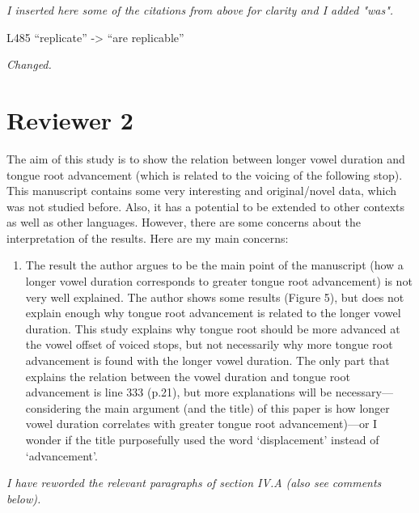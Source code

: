 \documentclass[]{article}
\providecommand{\tightlist}{%
  \setlength{\itemsep}{0pt}\setlength{\parskip}{0pt}}
\begin{document}
\begin{adjustwidth}{1cm}{} \textit{
I inserted here some of the citations from above for clarity and I added "was".
} \end{adjustwidth}

L485 ``replicate'' -\textgreater{} ``are replicable''

\begin{adjustwidth}{1cm}{} \textit{
Changed.
} \end{adjustwidth}

\hypertarget{reviewer-2}{%
\section{Reviewer 2}\label{reviewer-2}}

The aim of this study is to show the relation between longer vowel
duration and tongue root advancement (which is related to the voicing of
the following stop). This manuscript contains some very interesting and
original/novel data, which was not studied before. Also, it has a
potential to be extended to other contexts as well as other languages.
However, there are some concerns about the interpretation of the
results. Here are my main concerns:

\begin{enumerate}
\def\labelenumi{\arabic{enumi}.}
\tightlist
\item
  The result the author argues to be the main point of the manuscript
  (how a longer vowel duration corresponds to greater tongue root
  advancement) is not very well explained. The author shows some results
  (Figure 5), but does not explain enough why tongue root advancement is
  related to the longer vowel duration. This study explains why tongue
  root should be more advanced at the vowel offset of voiced stops, but
  not necessarily why more tongue root advancement is found with the
  longer vowel duration. The only part that explains the relation
  between the vowel duration and tongue root advancement is line 333
  (p.21), but more explanations will be necessary---considering the main
  argument (and the title) of this paper is how longer vowel duration
  correlates with greater tongue root advancement)---or I wonder if the
  title purposefully used the word `displacement' instead of
  `advancement'.
\end{enumerate}

\begin{adjustwidth}{1cm}{} \textit{
I have reworded the relevant paragraphs of section IV.A (also see comments below).
} \end{adjustwidth}
\end{document}
